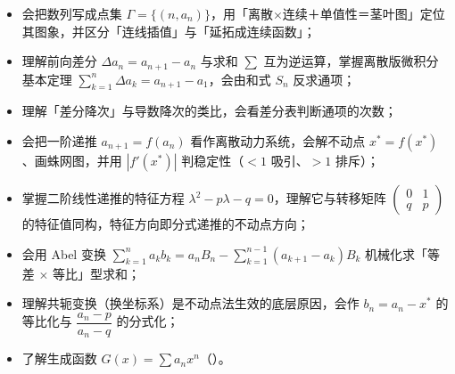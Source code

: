 \begin{learnobjective}
\begin{itemize}
  \item 会把数列写成点集 $\Gamma=\{(n,a_n)\}$，用「离散$\times$连续＋单值性＝茎叶图」定位其图象，并区分「连线插值」与「延拓成连续函数」；
  \item 理解前向差分 $\Delta a_n=a_{n+1}-a_n$ 与求和 $\sum$ 互为逆运算，掌握离散版微积分基本定理 $\sum_{k=1}^n\Delta a_k=a_{n+1}-a_1$，会由和式 $S_n$ 反求通项；
  \item 理解「差分降次」与导数降次的类比，会看差分表判断通项的次数；
  \item 会把一阶递推 $a_{n+1}=f(a_n)$ 看作离散动力系统，会解不动点 $x^*=f(x^*)$、画蛛网图，并用 $|f'(x^*)|$ 判稳定性（$<1$ 吸引、$>1$ 排斥）；
  \item 掌握二阶线性递推的特征方程 $\lambda^2-p\lambda-q=0$，理解它与转移矩阵 $\begin{pmatrix}0&1\\q&p\end{pmatrix}$ 的特征值同构，特征方向即分式递推的不动点方向；
  \item 会用 Abel 变换 $\sum_{k=1}^na_kb_k=a_nB_n-\sum_{k=1}^{n-1}(a_{k+1}-a_k)B_k$ 机械化求「等差 $\times$ 等比」型求和；
  \item 理解共轭变换（换坐标系）是不动点法生效的底层原因，会作 $b_n=a_n-x^*$ 的等比化与 $\dfrac{a_n-p}{a_n-q}$ 的分式化；
  \item 了解生成函数 $G(x)=\sum a_nx^n$（）。
\end{itemize}
\end{learnobjective}

